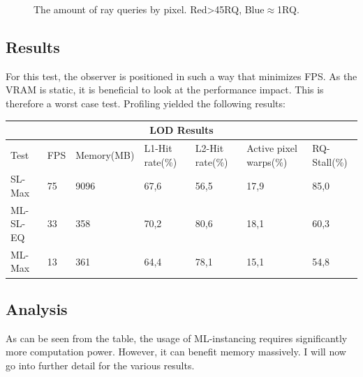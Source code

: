 \begin{figure}  
\hfill
{}
\hfill
{}
\hfill
\caption{The amount of ray queries by pixel. Red>45RQ, Blue$\approx$1RQ.}
\label{fig:MLQueryCount}
\end{figure}
\subsection{Results}
For this test, the observer is positioned in such a way that minimizes FPS. As the VRAM is static, it is beneficial to look at the performance impact. This is therefore a worst case test. Profiling yielded the following results:

\begin{center}
    \small{
\begin{tabular}{ |p{1.8cm}||p{0.7cm}|p{2.05cm}|p{1.8cm}|p{1.8cm}|p{2cm}|p{1.2cm}|  }
 \hline
 \multicolumn{7}{|c|}{LOD Results} \\
 \hline
 Test & FPS & Memory(MB) & L1-Hit rate(\%) & L2-Hit rate(\%) & Active pixel warps(\%) & RQ-Stall(\%)\\
 \hline
 SL-Max &   75  &   9096    &   67,6    &   56,5    &   17,9    &   85,0\\
 \hline
ML-SL-EQ    &   33  &   358 &   70,2    &   80,6    &   18,1    &   60,3\\
\hline
ML-Max  &   13  &   361  &  64,4    &   78,1    &   15,1    &   54,8\\
\hline
\end{tabular}
}
\end{center}

\subsection{Analysis}
As can be seen from the table, the usage of ML-instancing requires significantly more computation power. However, it can benefit memory massively. I will now go into further detail for the various results.
